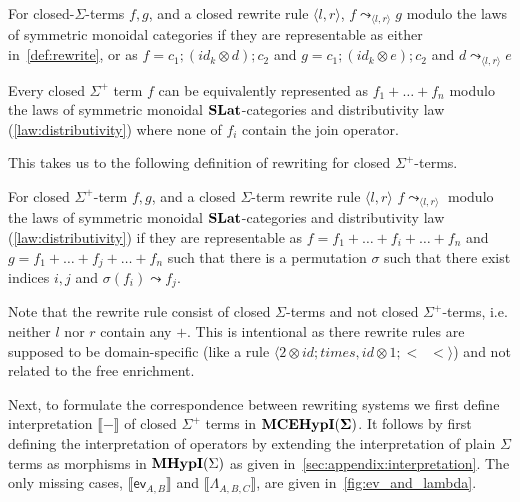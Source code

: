 \begin{definition}
	For closed-$\Sigma$-terms $f,g$, and a closed rewrite rule $\langle l, r \rangle$, $f \leadsto_{\langle l, r \rangle} g$ modulo the laws of symmetric monoidal categories if they are representable as either in~\autoref{def:rewrite}, or as
	$
		f = c_{1};(id_{k} \otimes d);c_{2} $ and $ g = c_{1};(id_{k} \otimes e);c_{2}
	$
	and $d \leadsto_{\langle l, r \rangle} e$
\end{definition}
\begin{lemma}
	\label{lemma:normal_form}
	Every closed $\Sigma^{+}$ term $f$ can be equivalently represented as
	$
		f_{1} + \ldots + f_{n}
	$ modulo the laws of symmetric monoidal $\mathbf{SLat}$-categories and distributivity law (\autoref{law:distributivity}) where none of $f_{i}$ contain the join operator.
\end{lemma}
This takes us to the following definition of rewriting for closed $\Sigma^{+}$-terms.
\begin{definition}
	For closed $\Sigma^{+}$-term $f,g$, and a closed $\Sigma$-term rewrite rule $\langle l, r \rangle$ $f \leadsto_{\langle l, r \rangle}$ modulo the laws of symmetric monoidal $\mathbf{SLat}$-categories and distributivity law (\autoref{law:distributivity}) if they are representable as
	$
		f = f_{1} + \ldots + f_{i} + \ldots + f_{n} $ and $ g = f_{1} + \ldots + f_{j} + \ldots + f_{n}
	$
	such that there is a permutation $\sigma$ such that there exist indices $i,j$ and $\sigma(f_{i}) \leadsto f_{j}$.
\end{definition}
Note that the rewrite rule consist of closed $\Sigma$-terms and not closed $\Sigma^{+}$-terms, i.e. neither $l$ nor $r$ contain any $+$.
This is intentional as there rewrite rules are supposed to be domain-specific (like a rule $\langle 2 \otimes id;times, id \otimes 1; <\;\;< \rangle$) and not related to the free enrichment.

Next, to formulate the correspondence between rewriting systems we first define interpretation $\llbracket - \rrbracket$ of closed $\Sigma^{+}$ terms in ${\mathbf{MCEHypI(\Sigma)}}$.
It follows by first defining the interpretation of operators by extending the interpretation of plain $\Sigma$ terms as morphisms in $\textbf{MHypI}(\Sigma)$ as given in~\autoref{sec:appendix:interpretation}.
The only missing cases, $\llbracket \textsf{ev}_{A,B} \rrbracket$ and $\llbracket \Lambda_{A,B,C} \rrbracket$, are given in~\autoref{fig:ev_and_lambda}.

